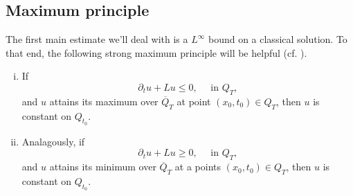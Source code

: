 \documentclass[11pt, a4paper]{article}
\begin{document}
\subsection{Maximum principle}
The first main estimate we'll deal with is a $L^\infty$ bound on a classical solution. To that end, the following strong maximum principle will be helpful (cf. \citep[p. 396]{evans}).

\begin{theorem}
\begin{enumerate}[i)]
	Suppose $\Omega$ is connected, and $u\in C^{2,1}(Q_T)\cap C(\overline{Q}_T)$, and $\partial_t + L$ is uniformly parabolic, then:
	\item If
	\begin{equation*}
		\partial_tu + Lu \leq 0, \quad \text{ in } Q_T, 
	\end{equation*}
	and $u$ attains its maximum over $\overline{Q}_T$ at point $(x_0,t_0)\in Q_T$, then
	$u$ is constant on $Q_{t_0}$.
	
	\item Analagously, if
	\begin{equation*}
		\partial_tu + Lu \geq 0, \quad \text{ in } Q_T, 
	\end{equation*}
	and $u$ attains its minimum over $\overline{Q}_T$ at a points  $(x_0,t_0) \in Q_T$, then $u$ is constant on $Q_{t_0}$.
\end{enumerate}
\end{theorem}
\end{document}
